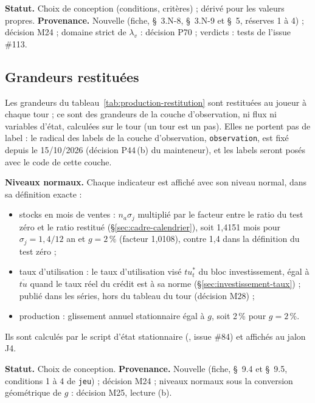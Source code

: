\documentclass[11pt,a4paper]{article}
\newcommand{\code}[1]{\texttt{\detokenize{#1}}}
\begin{document}
\textbf{Statut.} Choix de conception (conditions, critères) ; dérivé pour les valeurs propres. \textbf{Provenance.} Nouvelle (fiche, \S~3.N-8, \S~3.N-9 et \S~5, réserves 1 à 4) ; décision M24 ; domaine strict de $\lambda_v$ : décision P70 ; verdicts : tests de l'issue \#113.

\subsection{Grandeurs restituées}
\label{sec:production-restitution}
\begin{proposee}
Les grandeurs du tableau~\ref{tab:production-restitution} sont restituées au joueur à chaque tour ; ce sont des grandeurs de la couche d'observation, ni flux ni variables d'état, calculées sur le tour (un tour est un pas). Elles ne portent pas de label : le radical des labels de la couche d'observation, \texttt{observation}, est fixé depuis le 15/10/2026 (décision P44\,(b) du mainteneur), et les labels seront posés avec le code de cette couche.

\textbf{Niveaux normaux.} Chaque indicateur est affiché avec son niveau normal, dans sa définition exacte :
\begin{itemize}
\item stocks en mois de ventes : $n_a\sigma_j$ multiplié par le facteur entre le ratio du test zéro et le ratio restitué (\S\ref{sec:cadre-calendrier}), soit 1,4151 mois pour $\sigma_j = 1{,}4/12$ an et $g = 2\,\%$ (facteur 1,0108), contre 1,4 dans la définition du test zéro ;
\item taux d'utilisation : le taux d'utilisation visé $\mathit{tu}^\ast_t$ du bloc investissement, égal à $\overline{\mathit{tu}}$ quand le taux réel du crédit est à sa norme (\S\ref{sec:investissement-taux}) ; publié dans les séries, hors du tableau du tour (décision M28) ;
\item production : glissement annuel stationnaire égal à $g$, soit 2\,\% pour $g = 2\,\%$.
\end{itemize}
Ils sont calculés par le script d'état stationnaire (\code{outils/etat_stationnaire.py}, issue \#84) et affichés au jalon J4.

\textbf{Statut.} Choix de conception. \textbf{Provenance.} Nouvelle (fiche, \S~9.4 et \S~9.5, conditions 1 à 4 de \texttt{jeu}) ; décision M24 ; niveaux normaux sous la conversion géométrique de $g$ : décision M25, lecture (b).
\end{proposee}
\end{document}
